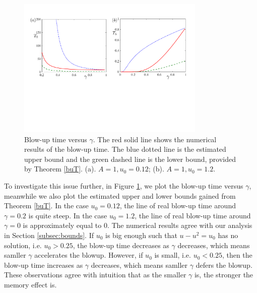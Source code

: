 \documentclass[12pt]{amsart}%
\theoremstyle{definition}
\theoremstyle{remark}
\begin{document}
\begin{figure}
	\begin{center}
		\includegraphics[width=0.8\textwidth]{finalgraphkeynote.pdf}
	\end{center}
	\caption{Blow-up time versus $\gamma$. The red solid line shows the numerical results of the blow-up time. The blue dotted line is the estimated upper bound and the green dashed line is the lower bound, provided by Theorem \ref{buT}. (a).  $A=1, u_0=0.12$; (b). $A=1, u_0=1.2$. }
	\label{fig:blow-uptime}
\end{figure}
To investigate this issue further, in Figure \ref{fig:blow-uptime}, we plot the blow-up time versus $\gamma$, meanwhile we also plot the estimated upper and lower bounds gained from Theorem \ref{buT}. 
In the case $u_0=0.12$, the line of real blow-up time around $\gamma =0.2$ is quite steep. In the case  $u_0=1.2$, the line of real blow-up time around $\gamma=0$ is approximately equal to 0. 
The numerical results agree with our analysis in Section \ref{subsec:bounds}. If $u_0$ is big enough such that $u-u^2=u_0$ has no solution, i.e. $u_0>0.25$, the blow-up time decreases as $\gamma$ decreases, which means samller $\gamma$ accelerates the blowup. However, if $u_0$ is small, i.e. $u_0<0.25$, then the blow-up time increases as $\gamma$ decreases, which means samller  $\gamma$ defers the blowup. These observations agree with intuition that as the smaller $\gamma$ is, the stronger the memory effect is. 
\end{document}
